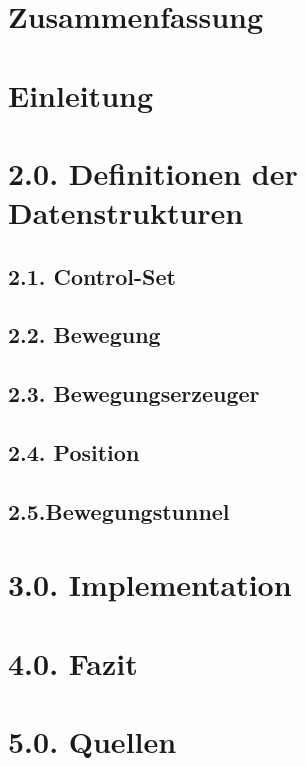 \documentclass[11pt,a4paper,oneside]{report}
\begin{document}


\section*{Zusammenfassung}


\section*{Einleitung}


\tableofcontents

\section*{2.0. Definitionen der Datenstrukturen}

\subsection*{2.1. Control-Set}

\subsection*{2.2. Bewegung}

\subsection*{2.3. Bewegungserzeuger}

\subsection*{2.4. Position}

\subsection*{2.5.Bewegungstunnel}


\section*{3.0. Implementation}


\section*{4.0. Fazit}

\section*{5.0. Quellen}

\end{document}
